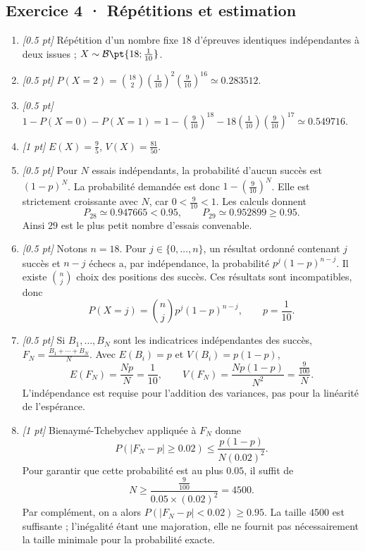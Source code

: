 \subsection*{Exercice 4 · Répétitions et estimation}\begin{enumerate}

\item \textit{[\num{0,5} pt]} Répétition d'un nombre fixe $18$ d'épreuves identiques indépendantes à deux issues ; $X\sim\mathcal B\pt{18;\frac{1}{10}}$.

\item \textit{[\num{0,5} pt]} $P(X=2)=\binom{18}2(\frac{1}{10})^2(\frac{9}{10})^{16}\simeq\num{0,283512}$.

\item \textit{[\num{0,5} pt]} $1-P(X=0)-P(X=1)=1-(\frac{9}{10})^{18}-18(\frac{1}{10})(\frac{9}{10})^{17}\simeq\num{0,549716}$.

\item \textit{[1 pt]} $E(X)=\frac{9}{5}$, $V(X)=\frac{81}{50}$.

\item \textit{[\num{0,5} pt]} Pour $N$ essais indépendants, la probabilité d'aucun succès est $(1-p)^N$. La probabilité demandée est donc $1-(\frac{9}{10})^N$. Elle est strictement croissante avec $N$, car $0<\frac{9}{10}<1$. Les calculs donnent
\[P_{28}\simeq\num{0,947665}<\num{0,95},\qquad P_{29}\simeq\num{0,952899}\ge\num{0,95}.\]
Ainsi $29$ est le plus petit nombre d'essais convenable.

\item \textit{[\num{0,5} pt]} Notons $n=18$. Pour $j\in\{0,\ldots,n\}$, un résultat ordonné contenant $j$ succès et $n-j$ échecs a, par indépendance, la probabilité $p^j(1-p)^{n-j}$. Il existe $\binom nj$ choix des positions des succès. Ces résultats sont incompatibles, donc
\[P(X=j)=\binom nj p^j(1-p)^{n-j},\qquad p=\frac{1}{10}.\]

\item \textit{[\num{0,5} pt]} Si $B_1,\ldots,B_N$ sont les indicatrices indépendantes des succès, $F_N=\frac{B_1+\cdots+B_N}{N}$. Avec $E(B_i)=p$ et $V(B_i)=p(1-p)$,
\[E(F_N)=\frac{Np}{N}=\frac{1}{10},\qquad V(F_N)=\frac{Np(1-p)}{N^2}=\frac{\frac{9}{100}}{N}.\]
L'indépendance est requise pour l'addition des variances, pas pour la linéarité de l'espérance.

\item \textit{[1 pt]} Bienaymé-Tchebychev appliquée à $F_N$ donne
\[P(|F_N-p|\ge\num{0,02})\le\frac{p(1-p)}{N(\num{0,02})^2}.\]
Pour garantir que cette probabilité est au plus $\num{0,05}$, il suffit de
\[N\ge\frac{\frac{9}{100}}{\num{0,05}\times(\num{0,02})^2}=4500.\]
Par complément, on a alors $P(|F_N-p|<\num{0,02})\ge\num{0,95}$. La taille $4500$ est suffisante ; l'inégalité étant une majoration, elle ne fournit pas nécessairement la taille minimale pour la probabilité exacte.

\end{enumerate}

